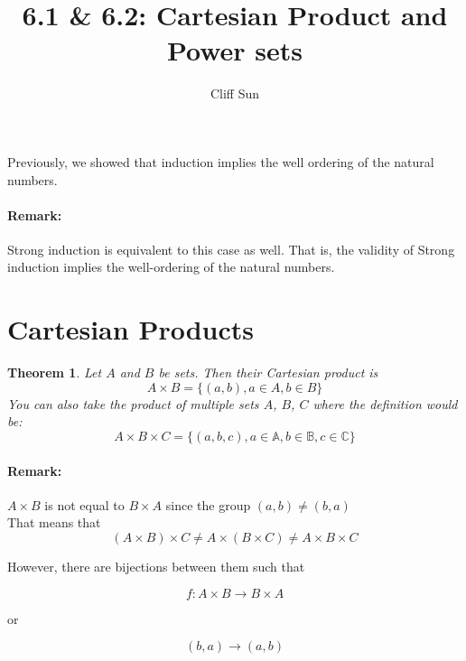 \documentclass{article}
\title{6.1 \& 6.2: Cartesian Product and Power sets}
\author{Cliff Sun}
\newtheorem{theorem}{Theorem}[section]
\begin{document}
\maketitle

Previously, we showed that induction implies the well ordering of the natural numbers. 

\paragraph{Remark:} Strong induction is equivalent to this case as well. That is, the validity of Strong induction implies the well-ordering of the natural numbers. 

\section*{Cartesian Products}

\begin{theorem}
    Let $A$ and $B$ be sets. Then their Cartesian product is 
    \begin{equation}
        A \times B = \{(a,b), a \in A, b \in B\}
    \end{equation}
    You can also take the product of multiple sets $A$, $B$, $C$ where the definition would be:
    \begin{equation}
        A \times B \times C = \{(a,b,c), a \in \mathbb{A}, b \in \mathbb{B}, c \in \mathbb{C}\}
    \end{equation}
\end{theorem}

\paragraph{Remark:} $A \times B$ is not equal to $B \times A$ since the group $(a,b) \neq (b,a)$ \\

That means that 
\begin{equation}
    (A \times B) \times C \neq A \times (B \times C) \neq A \times B \times C
\end{equation}

However, there are bijections between them such that 

\begin{equation}
    f: A \times B \rightarrow B \times A
\end{equation}

or 

\begin{equation}
    (b,a) \rightarrow (a,b)
\end{equation}
\end{document}
